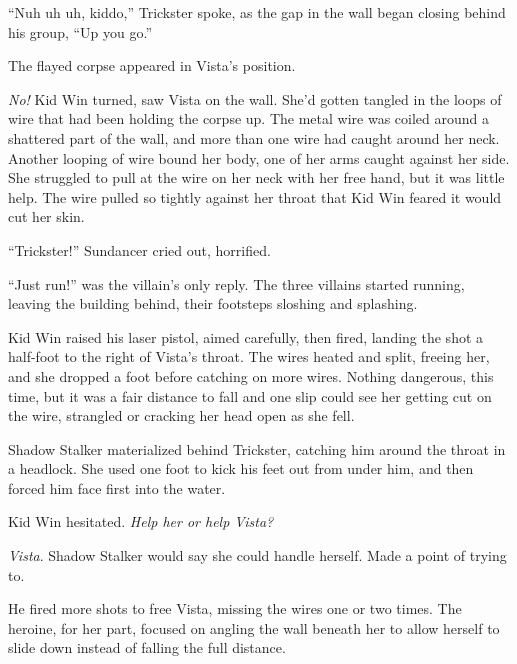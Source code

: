 ``Nuh uh uh, kiddo,'' Trickster spoke, as the gap in the wall began closing behind his group, ``Up you go.''



The flayed corpse appeared in Vista's position.



\emph{No!  }Kid Win turned, saw Vista on the wall.  She'd gotten tangled in the loops of wire that had been holding the corpse up.  The metal wire was coiled around a shattered part of the wall, and more than one wire had caught around her neck.  Another looping of wire bound her body, one of her arms caught against her side.  She struggled to pull at the wire on her neck with her free hand, but it was little help.  The wire pulled so tightly against her throat that Kid Win feared it would cut her skin.



``Trickster!'' Sundancer cried out, horrified.



``Just run!'' was the villain's only reply.  The three villains started running, leaving the building behind, their footsteps sloshing and splashing.



Kid Win raised his laser pistol, aimed carefully, then fired, landing the shot a half-foot to the right of Vista's throat.  The wires heated and split, freeing her, and she dropped a foot before catching on more wires.  Nothing dangerous, this time, but it was a fair distance to fall and one slip could see her getting cut on the wire, strangled or cracking her head open as she fell.



Shadow Stalker materialized behind Trickster, catching him around the throat in a headlock.  She used one foot to kick his feet out from under him, and then forced him face first into the water.



Kid Win hesitated.  \emph{Help her or help Vista?}



\emph{Vista}.  Shadow Stalker would say she could handle herself.  Made a point of trying to.



He fired more shots to free Vista, missing the wires one or two times.  The heroine, for her part, focused on angling the wall beneath her to allow herself to slide down instead of falling the full distance.



